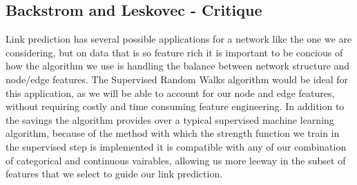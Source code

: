 \subsection{Backstrom and Leskovec - Critique}

\vspace{5mm}
\noindent
Link prediction has several possible applications for a network like the one 
we are considering, but on data that is so feature rich it is important to be 
concious of how the algorithm we use is handling the balance between network 
structure and node/edge features.  The Supervised Random Walks algorithm would
be ideal for this application, as we will be able to account for our node and 
edge features, without requiring costly and time consuming feature engineering. 
In addition to the savings the algorithm provides over a typical supervised
machine learning algorithm, because of the method with which the strength 
function we train in the supervised step is implemented it is compatible with 
any of our combination of categorical and continuous vairables, allowing us more
leeway in the subset of features that we select to guide our link prediction.



